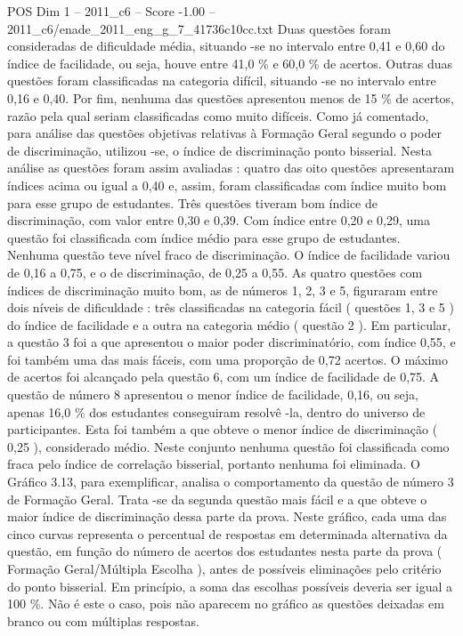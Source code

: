 \begin{textsample}{POS Dim 1 – 2011\_c6 – Score -1.00 – 2011\_c6/enade\_2011\_eng\_g\_7\_41736c10cc.txt}
Duas questões foram consideradas de dificuldade média, situando -se no intervalo entre 0,41 e 0,60 do índice de facilidade, ou seja, houve entre 41,0 \% e 60,0 \% de acertos.
Outras duas questões foram classificadas na categoria difícil, situando -se no intervalo entre 0,16 e 0,40.
Por fim, nenhuma das questões apresentou menos de 15 \% de acertos, razão pela qual seriam classificadas como muito difíceis.
Como já comentado, para análise das questões objetivas relativas à Formação Geral segundo o poder de discriminação, utilizou -se, o índice de discriminação ponto bisserial.
Nesta análise as questões foram assim avaliadas : quatro das oito questões apresentaram índices acima ou igual a 0,40 e, assim, foram classificadas com índice muito bom para esse grupo de estudantes.
Três questões tiveram bom índice de discriminação, com valor entre 0,30 e 0,39.
Com índice entre 0,20 e 0,29, uma questão foi classificada com índice médio para esse grupo de estudantes.
Nenhuma questão teve nível fraco de discriminação.
O índice de facilidade variou de 0,16 a 0,75, e o de discriminação, de 0,25 a 0,55.
As quatro questões com índices de discriminação muito bom, as de números 1, 2, 3 e 5, figuraram entre dois níveis de dificuldade : três classificadas na categoria fácil ( questões 1, 3 e 5 ) do índice de facilidade e a outra na categoria médio ( questão 2 ).
Em particular, a questão 3 foi a que apresentou o maior poder discriminatório, com índice 0,55, e foi também uma das mais fáceis, com uma proporção de 0,72 acertos.
O máximo de acertos foi alcançado pela questão 6, com um índice de facilidade de 0,75.
A questão de número 8 apresentou o menor índice de facilidade, 0,16, ou seja, apenas 16,0 \% dos estudantes conseguiram resolvê -la, dentro do universo de participantes.
Esta foi também a que obteve o menor índice de discriminação ( 0,25 ), considerado médio.
Neste conjunto nenhuma questão foi classificada como fraca pelo índice de correlação bisserial, portanto nenhuma foi eliminada.
O Gráfico 3.13, para exemplificar, analisa o comportamento da questão de número 3 de Formação Geral.
Trata -se da segunda questão mais fácil e a que obteve o maior índice de discriminação dessa parte da prova.
Neste gráfico, cada uma das cinco curvas representa o percentual de respostas em determinada alternativa da questão, em função do número de acertos dos estudantes nesta parte da prova ( Formação Geral/Múltipla Escolha ), antes de possíveis eliminações pelo critério do ponto bisserial.
Em princípio, a soma das escolhas possíveis deveria ser igual a 100 \%.
Não é este o caso, pois não aparecem no gráfico as questões deixadas em branco ou com múltiplas respostas.

\end{textsample}
